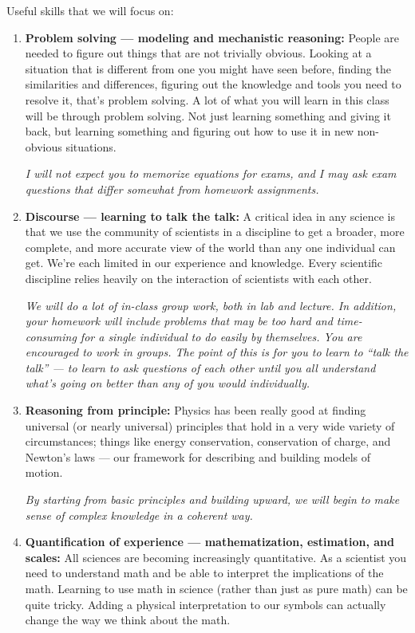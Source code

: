 Useful skills that we will focus on:
\begin{enumerate}
  \item {\bf Problem solving --- modeling and mechanistic reasoning:} 
    People are needed to figure out things that are not trivially obvious. Looking at a situation that is different from one you might have seen before, finding the similarities and differences, figuring out the knowledge and tools you need to resolve it, that's problem solving. A lot of what you will learn in this class will be through problem solving. Not just learning something and giving it back, but learning something and figuring out how to use it in new non-obvious situations.

    {\it I will not expect you to memorize equations for exams, and I may ask exam questions that differ somewhat from homework assignments.}

    \item {\bf Discourse --- learning to talk the talk:} 
      A critical idea in any science is that we use the community of scientists in a discipline to get a broader, more complete, and more accurate view of the world than any one individual can get. We're each limited in our experience and knowledge. Every scientific discipline relies heavily on the interaction of scientists with each other.

      {\it We will do a lot of in-class group work, both in lab and lecture. In addition, your homework will include problems that may be too hard and time-consuming for a single individual to do easily by themselves. You are encouraged to work in groups. The point of this is for you to learn to ``talk the talk'' --- to learn to ask questions of each other until you all understand what's going on better than any of you would individually.}
      
\item {\bf Reasoning from principle:}
  Physics has been really good at finding universal (or nearly universal) principles that hold in a very wide variety of circumstances; things like energy conservation, conservation of charge, and Newton's laws --- our framework for describing and building models of motion.

  {\it By starting from basic principles and building upward, we will begin to make sense of complex knowledge in a coherent way.}

\item {\bf Quantification of experience --- mathematization, estimation, and scales:}
  All sciences are becoming increasingly quantitative. As a scientist you need to understand math and be able to interpret the implications of the math. Learning to use math in science (rather than just as pure math) can be quite tricky. Adding a physical interpretation to our symbols can actually change the way we think about the math.


\end{enumerate}
